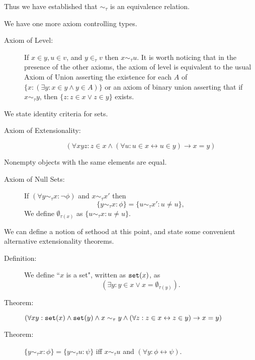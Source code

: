 \documentclass[12pt]{article}
\begin{document}
Thus we have established that $\sim_\tau$ is an equivalence relation.

We have one more axiom controlling types.  

\begin{description}

\item[Axiom of Level:]  If $x \in y, u \in v$, and $y \in_\tau v$ then $x \sim_\tau u$.  It is worth noticing that in the presence of the other axioms, the axiom of level is equivalent to
the usual Axiom of Union asserting the existence for each $A$ of $\{x:(\exists y:x \in y \wedge y \in A)\}$ or an axiom of binary union asserting that if $x \sim_\tau y$, then 
$\{z:z \in x \vee z \in y\}$ exists.

\end{description}

We state identity criteria for sets.

\begin{description}

\item[Axiom of Extensionality:]  $$(\forall xyz:z \in x \wedge (\forall  u:u \in x \leftrightarrow u \in y) \rightarrow x=y)$$

\end{description}

Nonempty objects with the same elements are equal.

\begin{description}

\item[Axiom of Null Sets:]  If $(\forall y \sim_\tau x:\neg \phi)$ and $x \sim_\tau x'$ then $$\{y \sim_\tau x:\phi\} = \{u \sim_\tau x':u \neq u\},$$ We define $\emptyset_{\tau(x)}$ as $\{u \sim_\tau x:u \neq u\}$.

\end{description}

We can define a notion of sethood at this point, and state some convenient alternative extensionality theorems.

\begin{description}

\item[Definition:]  We define ``$x$ is a set", written as ${\tt set}(x)$, as $$(\exists y:y \in x \vee x = \emptyset_{\tau(y)}).$$

\item[Theorem:]  $(\forall xy:{\tt set}(x) \wedge {\tt set}(y) \wedge x \sim_\tau y \wedge (\forall z:z \in x \leftrightarrow z \in y) \rightarrow x=y)$

\item[Theorem:]  $\{y \sim_\tau x:\phi\} = \{y \sim_\tau u:\psi\}$ iff $x \sim_\tau u$ and $(\forall y:\phi \leftrightarrow \psi)$.


\end{description}
\end{document}
